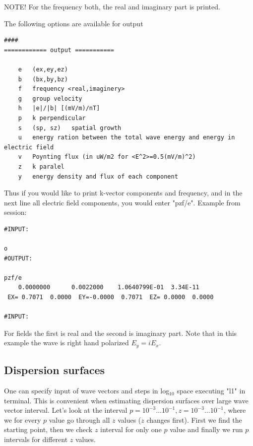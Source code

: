 \documentclass[a4,10pt]{article}
\begin{document}
NOTE! For the frequency both, the real and imaginary part is printed.

The following options are available for output

\begin{verbatim}
####
============ output ===========

    e   (ex,ey,ez)
    b   (bx,by,bz)
    f   frequency <real,imaginery>
    g   group velocity
    h   |e|/|b| [(mV/m)/nT]
    p   k perpendicular
    s   (sp, sz)   spatial growth
    u   energy ration between the total wave energy and energy in electric field
    v   Poynting flux (in uW/m2 for <E^2>=0.5(mV/m)^2)
    z   k paralel
    y   energy density and flux of each component

\end{verbatim}

Thus if you would like to print k-vector components and frequency, and in the next line all electric field components, you would enter "pzf/e". Example from session:

\begin{verbatim}
#INPUT:

o
#OUTPUT:

pzf/e
    0.0000000      0.0022000    1.0640799E-01  3.34E-11
 EX= 0.7071  0.0000  EY=-0.0000  0.7071  EZ= 0.0000  0.0000

#INPUT:

\end{verbatim}

For fields the first is real and the second is imaginary part. Note that in this example the wave is right hand polarized $E_y=iE_x$.

\subsection{Dispersion surfaces}

One can specify input of wave vectors and steps in log$_{10}$ space executing "l1" in terminal. This is convenient when estimating dispersion surfaces over large wave vector interval. Let's look at the interval $p=10^{-3}\ldots 10^{-1},z=10^{-3}\ldots 10^{-1}$, where we for every $p$ value go through all $z$ values ($z$ changes first). First we find the starting point, then we check $z$ interval for only one $p$ value and finally we run $p$ intervals for different $z$ values.
\end{document}
